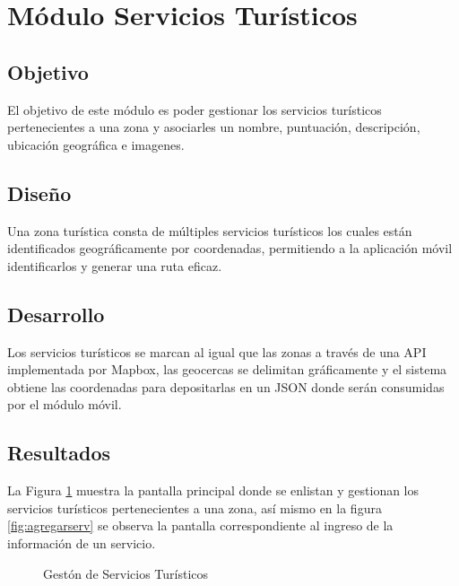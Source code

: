 \section{Módulo Servicios Turísticos}

\subsection{Objetivo}
El objetivo de este módulo es poder gestionar los servicios turísticos pertenecientes a una zona y asociarles un nombre, puntuación, descripción, ubicación geográfica e imagenes.

\subsection{Diseño}

Una zona turística consta de múltiples servicios turísticos los cuales están identificados geográficamente por coordenadas, permitiendo a la aplicación móvil identificarlos y generar una ruta eficaz.


\subsection{Desarrollo}

Los servicios turísticos se marcan al igual que las zonas a través de una API implementada por Mapbox, las geocercas se delimitan gráficamente y el sistema obtiene las coordenadas para depositarlas en un JSON donde serán consumidas por el módulo móvil.

\subsection{Resultados}

La Figura \ref{fig:servicios} muestra la pantalla principal donde se enlistan y gestionan  los servicios turísticos pertenecientes a una zona, así mismo en la figura \ref{fig:agregarserv} se observa la pantalla correspondiente al ingreso de la información de un servicio.\\

\begin{figure}[htbp]
	\begin{center}
		\caption{Gestón de Servicios Turísticos}
		\label{fig:servicios}
	\end{center}
\end{figure}

